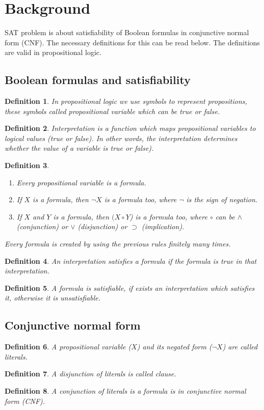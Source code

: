 \documentclass{article}
\newtheorem{definition}{Definition}
\begin{document}
\section{Background}
SAT problem is about satisfiability of Boolean formulas in conjunctive normal form (CNF). The necessary definitions for this can be read below. The definitions are valid in propositional logic.
\subsection{Boolean formulas and satisfiability}
\begin{definition}
In propositional logic we use symbols to represent propositions, these symbols called propositional variable which can be true or false.
\end{definition}
\begin{definition}
Interpretation is a function which maps propositional variables to logical values (true or false). In other words, the interpretation determines whether the value of a variable is true or false).
\end{definition}
\begin{definition}
\begin{enumerate}
    \item Every propositional variable is a formula.
    \item If $X$ is a formula, then $\neg X$ is a formula too, where $\neg $ is the sign of negation.
    \item If $X$ and $Y$ is a formula, then $(X \circ Y$) is a formula too, where $\circ$ can be $\wedge$ (conjunction) or $\vee$ (disjunction) or $\supset$ (implication).
\end{enumerate}
Every formula is created by using the previous rules finitely many times.
\end{definition}
\begin{definition}
An interpretation satisfies a formula if the formula is true in that interpretation.
\end{definition}
\begin{definition}
A formula is satisfiable, if exists an interpretation which satisfies it, otherwise it is unsatisfiable.
\end{definition}
\subsection{Conjunctive normal form}
\begin{definition}
A propositional variable ($X$) and its negated form ($\neg X$) are called literals.
\end{definition}
\begin{definition}
A disjunction of literals is called clause.
\end{definition}
\begin{definition}
A conjunction of literals is a formula is in conjunctive normal form (CNF).
\end{definition}
\end{document}
